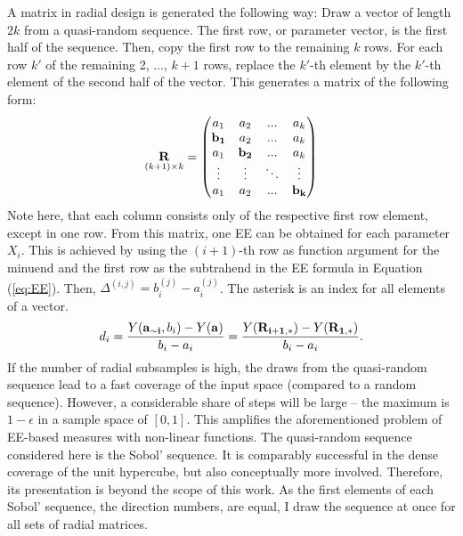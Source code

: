 \noindent
A matrix in radial design is generated the following way: Draw a vector of length $2k$ from a quasi-random sequence. The first row, or parameter vector, is the first half of the sequence. Then, copy the first row to the remaining $k$ rows. For each row $k'$ of the remaining 2, ..., $k+1$ rows, replace the $k'$-th element by the $k'$-th element of the second half of the vector. This generates a matrix of the following form:
\begin{align}
\underset{(k+1)\times k}{\bold{R}} =
\begin{pmatrix}
a_1 & a_2 & ... & a_k \\
\bold{b_1} & a_2 & ... & a_k \\
a_1 & \bold{b_2} & ... & a_k \\
\vdots & \vdots & 	\ddots & \vdots\\
a_1 & a_2 & ... & \bold{b_k}
\end{pmatrix}
\end{align}
\noindent
Note here, that each column consists only of the respective first row element, except in one row.
From this matrix, one EE can be obtained for each parameter $X_i$. This is achieved by using the $(i+1)$-th row as function argument for the minuend and the first row as the subtrahend in the EE formula in Equation (\ref{eq:EE}). Then, $\Delta^{(i,j)} = b_i^{(j)} - a_i^{(j)}$. The asterisk is an index for all elements of a vector.
\begin{align} \label{eq:rad}
d_i =  \frac{Y(\bold{a_{\sim i}}, b_i) - Y(\bold{a})}{b_i - a_i} = \frac{Y(\bold{R_{i+1,*}}) -  Y(\bold{R_{1,*}})}{b_i - a_i}.
\end{align}
If the number of radial subsamples is high, the draws from the quasi-random sequence lead to a fast coverage of the input space (compared to a random sequence). However, a considerable share of steps will be large -- the maximum is $1-\epsilon$ in a sample space of $[0,1]$. This amplifies the aforementioned problem of EE-based measures with non-linear functions. The quasi-random sequence considered here is the Sobol' sequence. It is comparably successful in the dense coverage of the unit hypercube, but also conceptually more involved. Therefore, its presentation is beyond the scope of this work. As the first elements of each Sobol' sequence, the direction numbers, are equal, I draw the sequence at once for all sets of radial matrices.\\

